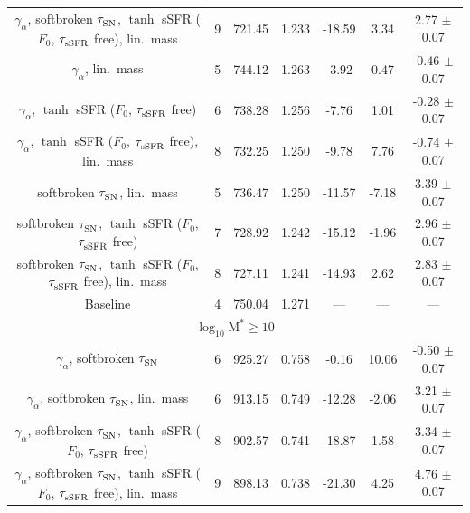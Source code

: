 \begin{longtable}{c c c c c c c}
    $\gamma_\alpha^{}$, softbroken $\tau_{\rm SN}^{}$, $\tanh$ sSFR ($F_0$, $\tau_{\rm sSFR}^{}$ free), lin.\ mass & 9 & 721.45 & 1.233 & \cellcolor{aicgreen}-18.59 & \cellcolor{aiclightorange}3.34 & \cellcolor{aicyellow}2.77 $\pm$ 0.07 \\
    $\gamma_\alpha^{}$, lin.\ mass & 5 & 744.12 & 1.263 & \cellcolor{aiclightyellow}-3.92 & 0.47 & -0.46 $\pm$ 0.07 \\
    $\gamma_\alpha^{}$, $\tanh$ sSFR ($F_0$, $\tau_{\rm sSFR}^{}$ free) & 6 & 738.28 & 1.256 & \cellcolor{aiclightgreen}-7.76 & 1.01 & -0.28 $\pm$ 0.07 \\
    $\gamma_\alpha^{}$, $\tanh$ sSFR ($F_0$, $\tau_{\rm sSFR}^{}$ free), lin.\ mass & 8 & 732.25 & 1.250 & \cellcolor{aiclightgreen}-9.78 & \cellcolor{aiclightred}7.76 & -0.74 $\pm$ 0.07 \\
    softbroken $\tau_{\rm SN}^{}$, lin.\ mass & 5 & 736.47 & 1.250 & \cellcolor{aicgreen}-11.57 & \cellcolor{aiclightgreen}-7.18 & \cellcolor{aiclightgreen}3.39 $\pm$ 0.07 \\
    softbroken $\tau_{\rm SN}^{}$, $\tanh$ sSFR ($F_0$, $\tau_{\rm sSFR}^{}$ free) & 7 & 728.92 & 1.242 & \cellcolor{aicgreen}-15.12 & -1.96 & \cellcolor{aicyellow}2.96 $\pm$ 0.07 \\
    softbroken $\tau_{\rm SN}^{}$, $\tanh$ sSFR ($F_0$, $\tau_{\rm sSFR}^{}$ free), lin.\ mass & 8 & 727.11 & 1.241 & \cellcolor{aicgreen}-14.93 & \cellcolor{aiclightorange}2.62 & \cellcolor{aicyellow}2.83 $\pm$ 0.07 \\
    Baseline & 4 & 750.04 & 1.271 & --- & --- & --- \\
    \hline
    \multicolumn{7}{c}{\textbf{$\log_{10}^{} \mathrm{M}^* \geq 10$}} \\
    \hline
    $\gamma_\alpha^{}$, softbroken $\tau_{\rm SN}^{}$ & 6 & 925.27 & 0.758 & -0.16 & \cellcolor{aicred}10.06 & -0.50 $\pm$ 0.07 \\
    $\gamma_\alpha^{}$, softbroken $\tau_{\rm SN}^{}$, lin.\ mass & 6 & 913.15 & 0.749 & \cellcolor{aicgreen}-12.28 & \cellcolor{aiclightyellow}-2.06 & \cellcolor{aiclightgreen}3.21 $\pm$ 0.07 \\
    $\gamma_\alpha^{}$, softbroken $\tau_{\rm SN}^{}$, $\tanh$ sSFR ($F_0$, $\tau_{\rm sSFR}^{}$ free) & 8 & 902.57 & 0.741 & \cellcolor{aicgreen}-18.87 & 1.58 & \cellcolor{aiclightgreen}3.34 $\pm$ 0.07 \\
    $\gamma_\alpha^{}$, softbroken $\tau_{\rm SN}^{}$, $\tanh$ sSFR ($F_0$, $\tau_{\rm sSFR}^{}$ free), lin.\ mass & 9 & 898.13 & 0.738 & \cellcolor{aicgreen}-21.30 & \cellcolor{aicorange}4.25 & \cellcolor{aiclightgreen}4.76 $\pm$ 0.07 \\

\end{longtable}
